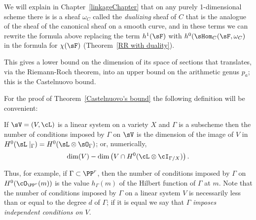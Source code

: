 We will explain in Chapter~\ref{linkageChapter} that on any purely 1-dimensional scheme there is is a sheaf $\omega_{C}$ called the  \emph{dualizing} sheaf of ${C}$ that is the analogue of the sheaf of the canonical sheaf on a smooth curve, and in these terms we can rewrite
the formula above replacing the term $h^1(\sF)$ with $h^0(\sHom_C(\sF, \omega_C)$ in the formula for $\chi(\sF)$ (Theorem~\ref{RR with duality}).

This gives a lower bound on the dimension of its space of sections that translates, via the Riemann-Roch theorem, into an upper bound on the arithmetic genus $p_a$; this is the Castelnuovo bound.

For the proof of Theorem~\ref{Castelnuovo's bound} the following definition will be convenient:

\begin{definition}
If $\sV = (V,\cL)$ is a linear system on a variety $X$ and $\Gamma$ is a subscheme then the number of conditions
imposed by $\Gamma$ on $\sV$ is the dimension of the image of $V$ in $H^0(\sL\mid_\Gamma) = H^0(\sL \otimes \sO_\Gamma)$; or, numerically,
$$
\dim(V) - \dim \left(V \cap H^0(\cL\otimes \cI_{\Gamma/X}) \right).
$$\end{definition}

Thus, for example, if $\Gamma \subset \PP^r$, then the number of conditions imposed by $\Gamma$ on $H^0(\cO_{\PP^r}(m))$ is the value $h_\Gamma(m)$ of the Hilbert function of $\Gamma$ at $m$.
Note that the number of conditions imposed by $\Gamma$ on a linear system $V$ is necessarily less than or equal to the degree $d$ of $\Gamma$; if it is equal we say that $\Gamma$ \emph{imposes independent conditions on $V$}.

